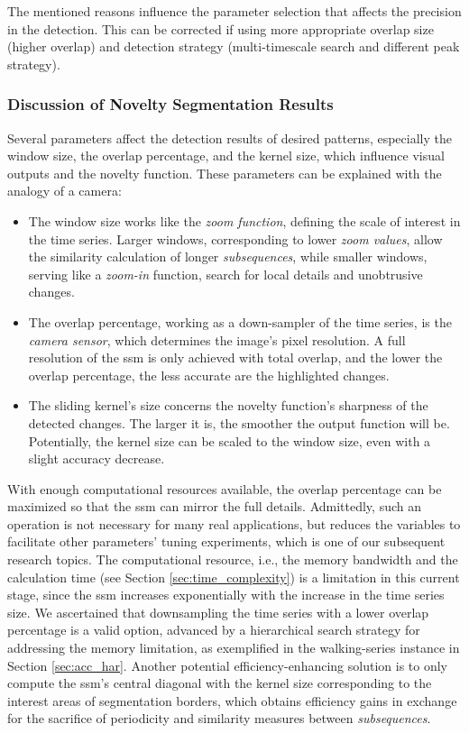 The mentioned reasons influence the parameter selection that affects the precision in the detection. This can be corrected if using more appropriate overlap size (higher overlap) and detection strategy (multi-timescale search and different peak strategy).

\subsubsection{Discussion of Novelty Segmentation Results}
\label{sec:novelty_seg_discussion}

Several parameters affect the detection results of desired patterns, especially the window size, the overlap percentage, and the kernel size, which influence visual outputs and the novelty function. These parameters can be explained with the analogy of a camera:

\begin{itemize}
    \item The window size works like the \textit{zoom function}, defining the scale of interest in the time series. Larger windows, corresponding to lower \textit{zoom values}, allow the similarity calculation of longer \textit{subsequences}, while smaller windows, serving like a \textit{zoom-in} function, search for local details and unobtrusive changes.
    \item The overlap percentage, working as a down-sampler of the time series, is the \textit{camera sensor}, which determines the image's pixel resolution. A full resolution of the \gls{ssm} is only achieved with total overlap, and the lower the overlap percentage, the less accurate are the highlighted changes.
    \item The sliding kernel's size concerns the novelty function's sharpness of the detected changes. The larger it is, the smoother the output function will be. Potentially, the kernel size can be scaled to the window size, even with a slight accuracy decrease.
\end{itemize}

With enough computational resources available, the overlap percentage can be maximized so that the \gls{ssm} can mirror the full details. Admittedly, such an operation is not necessary for many real applications, but reduces the variables to facilitate other parameters' tuning experiments, which is one of our subsequent research topics.
The computational resource, i.e., the memory bandwidth and the calculation time (see Section \ref{sec:time_complexity}) is a limitation in this current stage, since the \gls{ssm} increases exponentially with the increase in the time series size. We ascertained that downsampling the time series with a lower overlap percentage is a valid option, advanced by a hierarchical search strategy for addressing the memory limitation, as exemplified in the walking-series instance in Section \ref{sec:acc_har}. Another potential efficiency-enhancing solution is to only compute the \gls{ssm}'s central diagonal with the kernel size corresponding to the interest areas of segmentation borders, which obtains efficiency gains in exchange for the sacrifice of periodicity and similarity measures between \textit{subsequences}.

